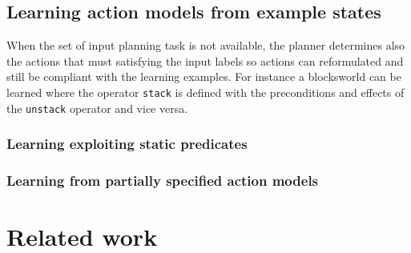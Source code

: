 \documentclass[letterpaper]{article} %
\begin{document}
\subsection{Learning action models from example states}
When the set of input planning task is not available, the planner determines also the actions that must satisfying the input labels so actions can reformulated and still be compliant with the learning examples. For instance a blocksworld can be learned where the operator {\small\tt stack} is defined with the preconditions and effects of the {\small\tt unstack} operator and vice versa. 

\subsubsection{Learning exploiting static predicates}
\subsubsection{Learning from partially specified action models}





\section{Related work}
\end{document}
